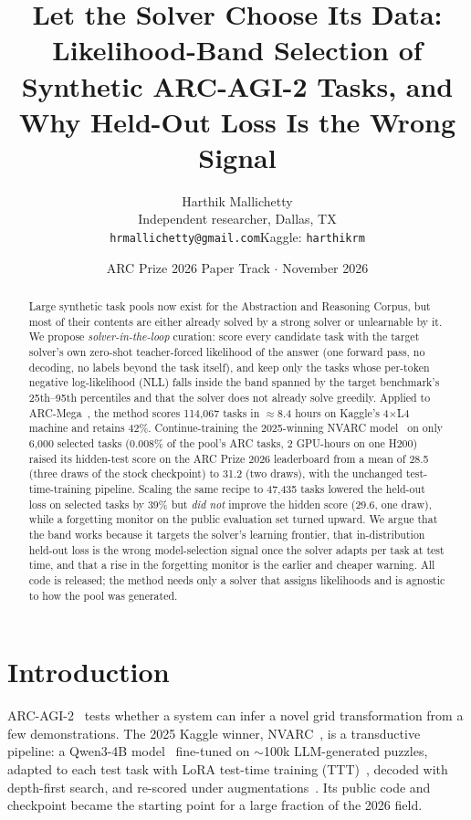 \documentclass[11pt]{article}
\title{\textbf{Let the Solver Choose Its Data:}\\[2pt]
\large Likelihood-Band Selection of Synthetic ARC-AGI-2 Tasks, and Why Held-Out Loss Is the Wrong Signal}
\author{Harthik Mallichetty\\
Independent researcher, Dallas, TX\\
\texttt{hrmallichetty@gmail.com}\quad Kaggle: \texttt{harthikrm}}
\date{ARC Prize 2026 Paper Track \quad $\cdot$ \quad November 2026}
\newcommand{\nvarc}{NVARC}
\newcommand{\mega}{ARC-Mega}
\begin{document}
\maketitle

\begin{abstract}
Large synthetic task pools now exist for the Abstraction and Reasoning Corpus, but most of their contents are either already solved by a strong solver or unlearnable by it. We propose \emph{solver-in-the-loop} curation: score every candidate task with the target solver's own zero-shot teacher-forced likelihood of the answer (one forward pass, no decoding, no labels beyond the task itself), and keep only the tasks whose per-token negative log-likelihood (NLL) falls inside the band spanned by the target benchmark's 25th--95th percentiles and that the solver does not already solve greedily. Applied to \mega{}~\citep{arcmega2025}, the method scores 114{,}067 tasks in $\approx$8.4 hours on Kaggle's 4$\times$L4 machine and retains 42\%. Continue-training the 2025-winning \nvarc{} model~\citep{nvarc2025} on only 6{,}000 selected tasks (0.008\% of the pool's ARC tasks, 2 GPU-hours on one H200) raised its hidden-test score on the ARC Prize 2026 leaderboard from a mean of 28.5 (three draws of the stock checkpoint) to 31.2 (two draws), with the unchanged test-time-training pipeline. Scaling the same recipe to 47{,}435 tasks lowered the held-out loss on selected tasks by 39\% but \emph{did not} improve the hidden score (29.6, one draw), while a forgetting monitor on the public evaluation set turned upward. We argue that the band works because it targets the solver's learning frontier, that in-distribution held-out loss is the wrong model-selection signal once the solver adapts per task at test time, and that a rise in the forgetting monitor is the earlier and cheaper warning. All code is released; the method needs only a solver that assigns likelihoods and is agnostic to how the pool was generated.
\end{abstract}

\section{Introduction}
ARC-AGI-2~\citep{chollet2025arcagi2} tests whether a system can infer a novel grid transformation from a few demonstrations. The 2025 Kaggle winner, \nvarc{}~\citep{nvarc2025}, is a transductive pipeline: a Qwen3-4B model~\citep{yang2025qwen3} fine-tuned on $\sim$100k LLM-generated puzzles, adapted to each test task with LoRA test-time training (TTT)~\citep{akyurek2024ttt}, decoded with depth-first search, and re-scored under augmentations~\citep{franzen2024architects,franzen2025architects}. Its public code and checkpoint became the starting point for a large fraction of the 2026 field.
\end{document}
